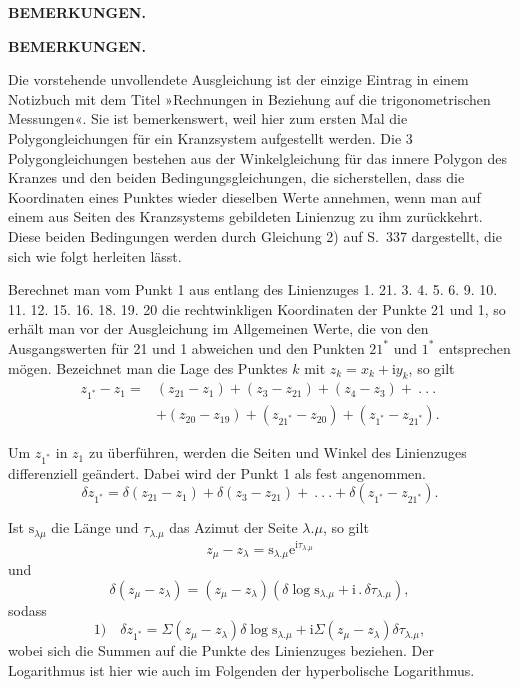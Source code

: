 \hfill\textbf{BEMERKUNGEN.}\hfill\mbox{}
\begin{center}\textbf{BEMERKUNGEN.}\end{center}

\par\noindent\hspace*{\parindent}Die vorstehende unvollendete Ausgleichung ist der einzige Eintrag in einem Notizbuch mit dem Titel »Rechnungen in Beziehung auf die trigonometrischen Messungen«. Sie ist bemerkenswert, weil hier zum ersten Mal die Polygongleichungen für ein Kranzsystem aufgestellt werden. Die 3 Polygongleichungen bestehen aus der Winkelgleichung für das innere Polygon des Kranzes und den beiden Bedingungsgleichungen, die sicherstellen, dass die Koordinaten eines Punktes wieder dieselben Werte annehmen, wenn man auf einem aus Seiten des Kranzsystems gebildeten Linienzug zu ihm zurückkehrt. Diese beiden Bedingungen werden durch Gleichung 2) auf S.~337 dargestellt, die sich wie folgt herleiten lässt.

\par\noindent\hspace*{\parindent}Berechnet man vom Punkt 1 aus entlang des Linienzuges 1. 21. 3. 4. 5. 6. 9. 10. 11. 12. 15. 16. 18. 19. 20 die rechtwinkligen Koordinaten der Punkte 21 und 1, so erhält man vor der Ausgleichung im Allgemeinen Werte, die von den Ausgangswerten für 21 und 1 abweichen und den Punkten \(21^*\) und \(1^*\) entsprechen mögen. Bezeichnet man die Lage des Punktes \(k\) mit \(z_k=x_k+\mathrm{i}y_k\), so gilt
\[
\begin{aligned}
z_{1^*}-z_1={}&(z_{21}-z_1)+(z_3-z_{21})+(z_4-z_3)+\ .\ .\ .\\
&+(z_{20}-z_{19})+(z_{21^*}-z_{20})+(z_{1^*}-z_{21^*}).
\end{aligned}
\]
\par\noindent\hspace*{\parindent}Um \(z_{1^*}\) in \(z_1\) zu überführen, werden die Seiten und Winkel des Linienzuges differenziell geändert. Dabei wird der Punkt 1 als fest angenommen.
\[
\delta z_{1^*}=\delta(z_{21}-z_1)+\delta(z_3-z_{21})+\ .\ .\ .+\delta(z_{1^*}-z_{21^*}).
\]
\par\noindent\hspace*{\parindent}Ist \(\mathrm{s}_{\lambda\mu}\) die Länge und \(\tau_{\lambda.\mu}\) das Azimut der Seite \(\lambda.\mu\), so gilt
\[
z_\mu-z_\lambda=\mathrm{s}_{\lambda.\mu}\mathrm{e}^{\mathrm{i}\tau_{\lambda.\mu}}
\]
\noindent und
\[
\delta(z_\mu-z_\lambda)=(z_\mu-z_\lambda)(\delta\log\mathrm{s}_{\lambda.\mu}+\mathrm{i}\,.\,\delta\tau_{\lambda.\mu}),
\]
\noindent sodass
\[
1)\quad\delta z_{1^*}=\Sigma(z_\mu-z_\lambda)\delta\log\mathrm{s}_{\lambda.\mu}+\mathrm{i}\Sigma(z_\mu-z_\lambda)\delta\tau_{\lambda.\mu},
\]
\noindent wobei sich die Summen auf die Punkte des Linienzuges beziehen. Der Logarithmus ist hier wie auch im Folgenden der hyperbolische Logarithmus.

